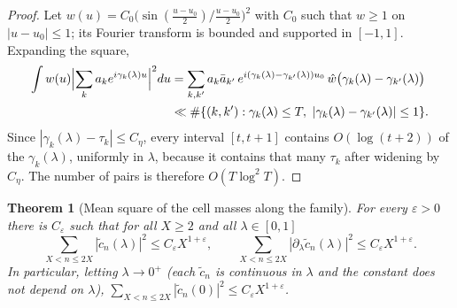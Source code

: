 \documentclass[11pt,reqno]{amsart}
\numberwithin{equation}{section}
\theoremstyle{plain}
\newtheorem{theorem}{Theorem}[section]
\theoremstyle{definition}
\theoremstyle{remark}
\newcommand{\eps}{\varepsilon}
\begin{document}
\begin{proof}
Let $w(u)=C_0\bigl(\sin(\frac{u-u_0}2)/\frac{u-u_0}2\bigr)^2$ with $C_0$ such that $w\ge1$ on $|u-u_0|\le1$; its Fourier transform is bounded and supported in $[-1,1]$.  Expanding the square,
\begin{align}
\int w(u)\Bigl|\sum_ka_ke^{i\gamma_k(\lambda)u}\Bigr|^2du&=\sum_{k,k'}a_k\bar a_{k'}\,e^{i(\gamma_k(\lambda)-\gamma_{k'}(\lambda))u_0}\,\hat w\bigl(\gamma_k(\lambda)-\gamma_{k'}(\lambda)\bigr)\nonumber\\
&\ll\#\{(k,k'):\gamma_k(\lambda)\le T,\ |\gamma_k(\lambda)-\gamma_{k'}(\lambda)|\le1\}.\label{eq:fejer-pairs}
\end{align}
Since $|\gamma_k(\lambda)-\tau_k|\le C_\eta$, every interval $[t,t+1]$ contains $O(\log(t+2))$ of the $\gamma_k(\lambda)$, uniformly in $\lambda$, because it contains that many $\tau_k$ after widening by $C_\eta$.  The number of pairs is therefore $O(T\log^2T)$.
\end{proof}

\begin{theorem}[Mean square of the cell masses along the family]\label{thm:mean-square-cells}
For every $\eps>0$ there is $C_\eps$ such that for all $X\ge2$ and all $\lambda\in[0,1]$
\begin{equation}\label{eq:mean-square-cells}
 \sum_{X<n\le2X}|\tilde c_n(\lambda)|^2\le C_\eps X^{1+\eps},\qquad
 \sum_{X<n\le2X}|\partial_\lambda\tilde c_n(\lambda)|^2\le C_\eps X^{1+\eps}.
\end{equation}
In particular, letting $\lambda\to0^+$ (each $\tilde c_n$ is continuous in $\lambda$ and the constant does not depend on $\lambda$), $\sum_{X<n\le2X}|\tilde c_n(0)|^2\le C_\eps X^{1+\eps}$.
\end{theorem}
\end{document}
